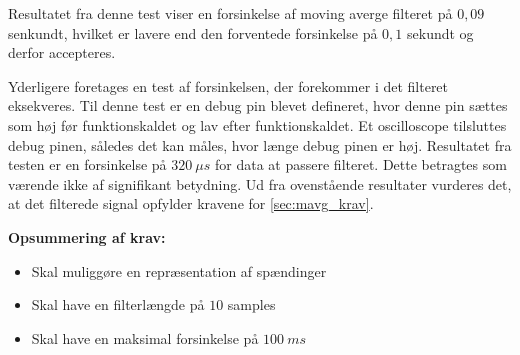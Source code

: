 \noindent
Resultatet fra denne test viser en forsinkelse af moving averge filteret på $0,09$ senkundt, hvilket er lavere end den forventede forsinkelse på $0,1$ sekundt og derfor accepteres. 

Yderligere foretages en test af forsinkelsen, der forekommer i det filteret eksekveres. Til denne test er en debug pin blevet defineret, hvor denne pin sættes som høj før funktionskaldet og lav efter funktionskaldet. Et oscilloscope tilsluttes debug pinen, således det kan måles, hvor længe debug pinen er høj. Resultatet fra testen er en forsinkelse på $320~\mu s$ for data at passere filteret. Dette betragtes som værende ikke af signifikant betydning.    
Ud fra ovenstående resultater vurderes det, at det filterede signal opfylder kravene for \autoref{sec:mavg_krav}. 


\vspace{3mm}
\textbf{Opsummering af krav:}
\begin{itemize}
\item[\text{\sffamily \checkmark}] Skal muliggøre en repræsentation af spændinger 
\item[\text{\sffamily \checkmark}] Skal have en filterlængde på $10$ samples
\item[\text{\sffamily \checkmark}] Skal have en maksimal forsinkelse på $100~ms$
\end{itemize}